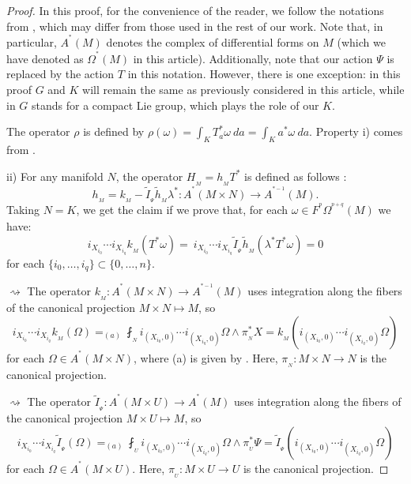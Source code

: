 \documentclass[a4paper,oneside,10pt,reqno]{amsart}
\theoremstyle{definition}
\newcommand{\wt}{\widetilde}
\newcommand\Om{\Omega}
\newcommand\om{\omega}
\newcommand{\bi}[2]{{#1}^{^{#2}}}
\newcommand{\ib}[2]{{#1}_{_{#2}}}
\newcommand{\lau}[4]{{#1}^{^{#2}}_{_{#3}}{\left( #4 \right)}}
\newcommand{\coho}[3]{{#1}^{^{#2}}{\left( #3 \right)}}
\begin{document}
\begin{proof}
In this proof, for the convenience of the reader, we follow the notations from \cite[Chap. 4, Sec.1]{MR0336651}, which may differ from those used in the rest of our work. 
Note that, in particular, $\coho A*M$ denotes the complex of differential forms on $M$ (which we have denoted as $\coho\Om * M$ in this article).
Additionally, note that our action $\Psi$ is replaced by the action $T$ in this notation.
However, there is one exception: in
this proof $G$ and $K$
will remain the
same as previously
considered in this
article, while in \cite[Chap.~4, Sec.~1]{MR0336651} 
$G$ stands for a
compact Lie group,
which plays the role of our $K$.



The operator $\rho$ is defined by $
\rho(\omega) = \int_K T_a^*\omega \ da  = \int_K a^*\omega \ d a.
$
Property i) comes from \cite[Chap. 4, Sec. 1]{MR0336651}. 

	ii) For any manifold $N$, 
the operator $ \ib{H}{M} =  \ib{h}{M} T^*$  is defined as follows
	:
$$
 \ib{h}{M}  =  \ib{k}{M} - \ib{\wt{I}}{\Psi}\ib{\wt{h}}{M} \lambda^* \colon \coho A * {M\times N} \to \coho A {*-1}M.
$$
Taking $N=K$, we get the claim if we prove that, for each $\om \in \bi{F}{p} \lau{\Om}{p+q}{}{M}$ we have:
\begin{equation}\label{ii}
i_{X_{i_0}} \cdots i_{X_{i_q}} \ib{k}{M}( T^*\om)  =  \ i_{X_{i_0}} \cdots i_{X_{i_q}}  \ib{\wt{I}}{\Psi}\ib{\wt{h}}{M}( \lambda^*  T^*\om)  = 0
\end{equation}
for each $\{i_0, \ldots,i_q\} \subset \{0,\ldots,n\}$.
\smallskip

$  \rightsquigarrow$  The operator $\ib{k}{M}\colon \coho A * {M\times N} \to \coho  A {*-1} M$ uses integration 
 along
the fibers of the canonical projection
 $M \times N \mapsto M$, so
$$
i_{X_{i_0}} \cdots i_{X_{i_q}} \ib{k}{M}(\Om)=_{(a)}
\ib{\fint}{N}i_{(X_{i_0},0)} \cdots i_{(X_{i_q},0)} \Om \wedge \ib{\pi}{N}^*X = \ib{k}{M}(i_{(X_{i_0},0)} \cdots i_{(X_{i_q},0)} \Om)
$$
for each $\Om \in \coho A * {M\times N}$, where (a) is given by \cite[Chap. VII, Sec.5, Proposition X (1)]{MR0336650}.
Here, $\ib{\pi}{N}\colon M \times N \rightarrow N$ is the canonical projection.

$  \rightsquigarrow$ The operator $\ib{\wt{I}}{\Psi}\colon \coho A * {M\times U} \to \coho  A {*} M$ uses integration  along
the fibers of the canonical projection $ M\times U \mapsto M$, so
$$
i_{X_{i_0}} \cdots i_{X_{i_q}} \ib{\wt{I}}{\Psi}(\Om)=_{(a)}
\ib{\fint}{U}i_{(X_{i_0},0)} \cdots i_{(X_{i_q},0)}\Om \wedge \ib{\pi}{U}^*\Psi =  \ib{\wt{I}}{\Psi}(i_{(X_{i_0},0)} \cdots i_{(X_{i_q},0)}\Om)
$$
for each $\Om \in \coho A * {M\times U}$.
Here, $\ib{\pi}{U}\colon M \times U \rightarrow U$ is the canonical projection.


\end{proof}
\end{document}
